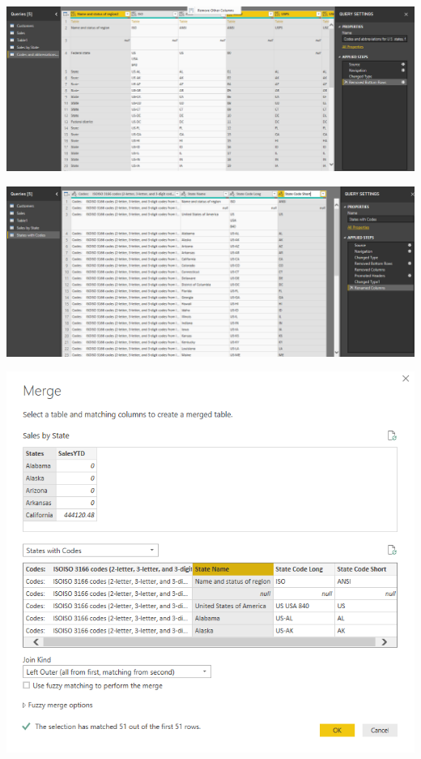 	\begin{center}
	\includegraphics[width=15cm]{./images/power18}
	\end{center}	

	\begin{center}
	\includegraphics[width=15cm]{./images/power19}
	\end{center}	

	\begin{center}
	\includegraphics[width=15cm]{./images/power20}
	\end{center}	
